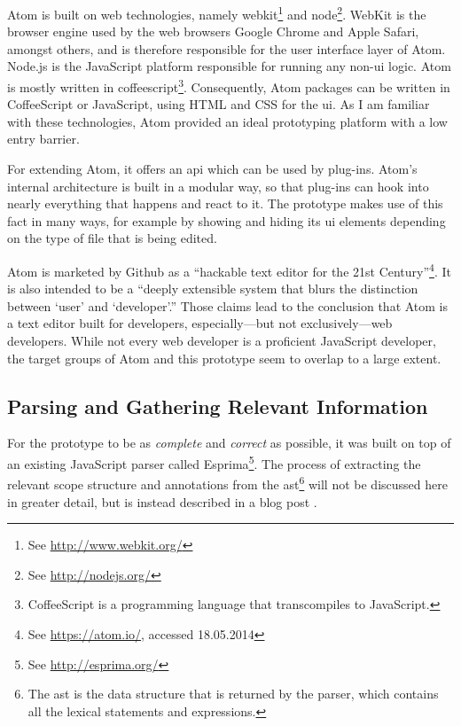 Atom is built on web technologies, namely
\gls{webkit}\footnote{See \url{http://www.webkit.org/}} and
\gls{node}\footnote{See \url{http://nodejs.org/}}. WebKit is the browser
engine used by the web browsers Google Chrome and Apple Safari, amongst
others, and is therefore responsible for the user interface layer of
Atom. Node.js is the JavaScript platform responsible for running any
non-\ac{ui} logic. Atom is mostly written in
\gls{coffeescript}\footnote{CoffeeScript is a programming language that transcompiles to JavaScript.}.
Consequently, Atom packages can be written in CoffeeScript or
JavaScript, using HTML and CSS for the \ac{ui}. As I am familiar with
these technologies, Atom provided an ideal prototyping platform with a
low entry barrier.

For extending Atom, it offers an \ac{api} which can be used by plug-ins.
Atom’s internal architecture is built in a modular way, so that plug-ins
can hook into nearly everything that happens and react to it. The
prototype makes use of this fact in many ways, for example by showing
and hiding its \ac{ui} elements depending on the type of file that is
being edited.

Atom is marketed by Github as a “hackable text editor for the 21st
Century”\footnote{See \url{https://atom.io/}, accessed 18.05.2014}. It
is also intended to be a “deeply extensible system that blurs the
distinction between ‘user’ and ‘developer’.” Those claims lead to the
conclusion that Atom is a text editor built for developers,
especially—but not exclusively—web developers. While not every web
developer is a proficient JavaScript developer, the target groups of
Atom and this prototype seem to overlap to a large extent.

\subsection{Parsing and Gathering Relevant
Information}\label{parsing-and-gathering-relevant-information}

For the prototype to be as \emph{complete} and \emph{correct} as
possible, it was built on top of an existing JavaScript parser called
Esprima\footnote{See \url{http://esprima.org/}}. The process of
extracting the relevant scope structure and annotations from the
\ac{ast}\footnote{The \ac{ast} is the data structure that is returned by the parser, which contains all the lexical statements and expressions.}
will not be discussed here in greater detail, but is instead described
in a blog post \cite{tvo}.

